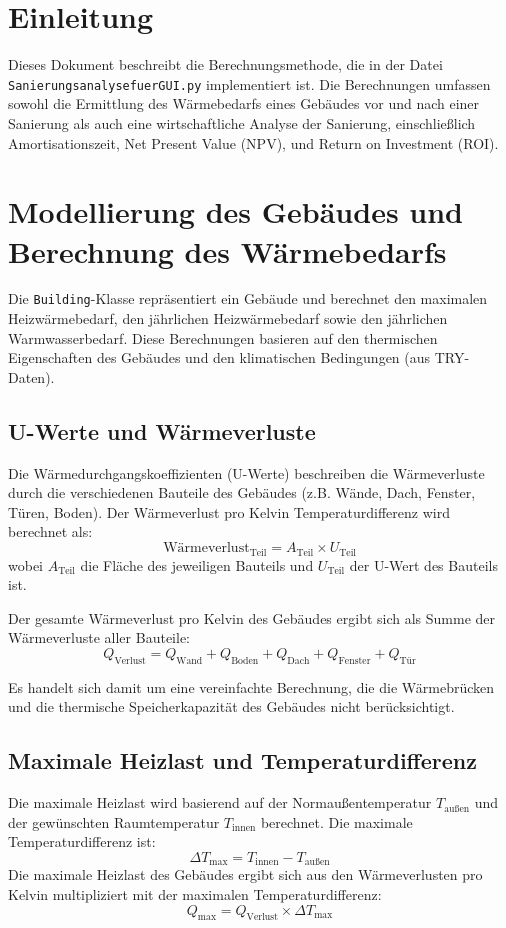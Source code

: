 \section{Einleitung}
Dieses Dokument beschreibt die Berechnungsmethode, die in der Datei \texttt{SanierungsanalysefuerGUI.py} implementiert ist. Die Berechnungen umfassen sowohl die Ermittlung des Wärmebedarfs eines Gebäudes vor und nach einer Sanierung als auch eine wirtschaftliche Analyse der Sanierung, einschließlich Amortisationszeit, Net Present Value (NPV), und Return on Investment (ROI). 

\section{Modellierung des Gebäudes und Berechnung des Wärmebedarfs}
Die \texttt{Building}-Klasse repräsentiert ein Gebäude und berechnet den maximalen Heizwärmebedarf, den jährlichen Heizwärmebedarf sowie den jährlichen Warmwasserbedarf. Diese Berechnungen basieren auf den thermischen Eigenschaften des Gebäudes und den klimatischen Bedingungen (aus TRY-Daten).

\subsection{U-Werte und Wärmeverluste}
Die Wärmedurchgangskoeffizienten (U-Werte) beschreiben die Wärmeverluste durch die verschiedenen Bauteile des Gebäudes (z.B. Wände, Dach, Fenster, Türen, Boden). Der Wärmeverlust pro Kelvin Temperaturdifferenz wird berechnet als:
\[
\text{Wärmeverlust}_\text{Teil} = A_\text{Teil} \times U_\text{Teil}
\]
wobei \( A_\text{Teil} \) die Fläche des jeweiligen Bauteils und \( U_\text{Teil} \) der U-Wert des Bauteils ist.

Der gesamte Wärmeverlust pro Kelvin des Gebäudes ergibt sich als Summe der Wärmeverluste aller Bauteile:
\[
Q_{\text{Verlust}} = Q_{\text{Wand}} + Q_{\text{Boden}} + Q_{\text{Dach}} + Q_{\text{Fenster}} + Q_{\text{Tür}}
\]

Es handelt sich damit um eine vereinfachte Berechnung, die die Wärmebrücken und die thermische Speicherkapazität des Gebäudes nicht berücksichtigt.

\subsection{Maximale Heizlast und Temperaturdifferenz}
Die maximale Heizlast wird basierend auf der Normaußentemperatur \( T_{\text{außen}} \) und der gewünschten Raumtemperatur \( T_{\text{innen}} \) berechnet. Die maximale Temperaturdifferenz ist:
\[
\Delta T_{\text{max}} = T_{\text{innen}} - T_{\text{außen}}
\]
Die maximale Heizlast des Gebäudes ergibt sich aus den Wärmeverlusten pro Kelvin multipliziert mit der maximalen Temperaturdifferenz:
\[
Q_{\text{max}} = Q_{\text{Verlust}} \times \Delta T_{\text{max}}
\]

